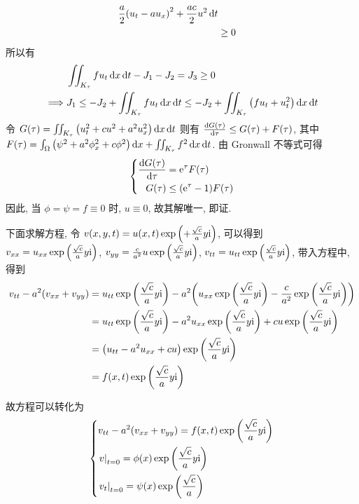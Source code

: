 \begin{solution}
\[\begin{aligned}
{    \frac{a}{2} {\left( {
        u_t - a u_x
    } \right)}^2 + \frac{a c}{2}u^2
} \operatorname{d\!} t \\
&\geq 0
\end{aligned} \]
所以有
\[ \begin{aligned}
& \iint_{K_\tau} f u_t \operatorname{d\!} x \operatorname{d\!} t - J_1 - J_2 = J_3 \geq 0 \\
\implies & J_1 \leq -J_2 + \iint_{K_\tau} f u_t \operatorname{d\!} x \operatorname{d\!} t
  \leq -J_2 + \iint_{K_\tau} {\left( {f u_t + u_t^2} \right)} \operatorname{d\!} x \operatorname{d\!} t
\end{aligned} \]
令 $G(\tau) = \iint_{K_\tau}{\left( {u_t^2 + c u^2 + a^2 u_x^2} \right)}\operatorname{d\!} x\operatorname{d\!} t$
则有 ${\frac{\operatorname{d\!} {G(\tau)}}{\operatorname{d\!} {\tau}}} \leq G(\tau) + F(\tau)$, 其中
$F(\tau) = \int_\Omega {\left( {\psi^2 + a^2 \phi_x^2 + c\phi^2} \right)} \operatorname{d\!} x
+\iint_{K_\tau} f^2 \operatorname{d\!} x \operatorname{d\!} t$.
由 Gronwall 不等式可得
\[ {\left\{ \begin{aligned} 
    {\frac{\operatorname{d\!}{G(\tau)}}{\operatorname{d\!}{\tau}}} &= {\mathrm e}^\tau F(\tau) \\
    G(\tau) &\leq ({\mathrm e}^\tau - 1) F(\tau)
 \end{aligned} \right.} \]
因此, 当 $\phi = \psi = f \equiv 0$ 时, $u \equiv 0$, 故其解唯一, 即证.

下面求解方程, 令 $v(x, y, t) = u(x, t) \exp{\left( {+\frac{\sqrt{c}}{a}y{\mathrm i}} \right)}$,
可以得到 $v_{xx} = u_{xx} \exp{\left( {\frac{\sqrt{c}}{a}y{\mathrm i}} \right)}$,
$v_{yy} = \frac{c}{a^2} u \exp{\left( {\frac{\sqrt{c}}{a}y{\mathrm i}} \right)}$,
$v_{tt} = u_{tt} \exp{\left( {\frac{\sqrt{c}}{a}y{\mathrm i}} \right)}$, 带入方程中, 得到
\[ \begin{aligned}
v_{tt} - a^2 (v_{xx} + v_{yy}) &= u_{tt} \exp{\left( {\frac{\sqrt{c}}{a}y{\mathrm i}} \right)}
  - a^2 {\left( {
    u_{xx} \exp{\left( {\frac{\sqrt{c}}{a}y{\mathrm i}} \right)}
    - \frac{c}{a^2} \exp{\left( {\frac{\sqrt{c}}{a}y{\mathrm i}} \right)}
  } \right)} \\
&= u_{tt} \exp{\left( {\frac{\sqrt{c}}{a}y{\mathrm i}} \right)}
  - a^2 u_{xx} \exp{\left( {\frac{\sqrt{c}}{a}y{\mathrm i}} \right)}
  + c u \exp{\left( {\frac{\sqrt{c}}{a}y{\mathrm i}} \right)} \\
&= {\left( {u_{tt} - a^2 u_{xx} + cu} \right)} \exp{\left( {\frac{\sqrt{c}}{a}y{\mathrm i}} \right)} \\
&= f(x, t) \exp{\left( {\frac{\sqrt{c}}{a}y{\mathrm i}} \right)}
\end{aligned} \]

故方程可以转化为
\[ {\left\{ \begin{aligned} 
&v_{tt} - a^2 (v_{xx}+v_{yy}) = f(x, t) \exp{\left( {\frac{\sqrt{c}}{a}y{\mathrm i}} \right)}\\
&{\left.{v} \right|}_{t=0} = \phi(x) \exp{\left( {\frac{\sqrt{c}}{a}y{\mathrm i}} \right)} \\
&{\left.{v_t} \right|}_{t=0} = \psi(x) \exp{\left( {\frac{\sqrt{c}}{a}} \right)}
 \end{aligned} \right.} \]


\end{solution}
